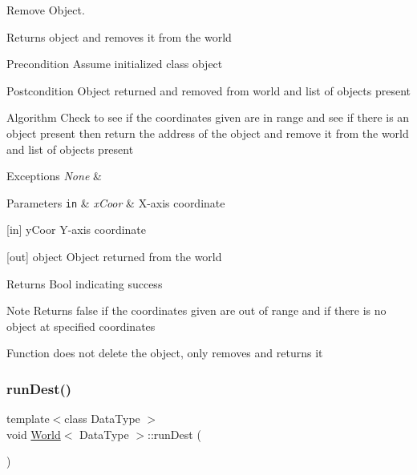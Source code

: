 Remove Object. 

Returns object and removes it from the world

\begin{DoxyPrecond}{Precondition}
Assume initialized class object
\end{DoxyPrecond}
\begin{DoxyPostcond}{Postcondition}
Object returned and removed from world and list of objects present
\end{DoxyPostcond}
\begin{DoxyParagraph}{Algorithm}
Check to see if the coordinates given are in range and see if there is an object present then return the address of the object and remove it from the world and list of objects present
\end{DoxyParagraph}

\begin{DoxyExceptions}{Exceptions}
{\em None} & \\
\hline
\end{DoxyExceptions}

\begin{DoxyParams}[1]{Parameters}
\mbox{\tt in}  & {\em x\+Coor} & X-\/axis coordinate\\
\hline
\end{DoxyParams}
\mbox{[}in\mbox{]} y\+Coor Y-\/axis coordinate

\mbox{[}out\mbox{]} object Object returned from the world

\begin{DoxyReturn}{Returns}
Bool indicating success
\end{DoxyReturn}
\begin{DoxyNote}{Note}
Returns false if the coordinates given are out of range and if there is no object at specified coordinates

Function does not delete the object, only removes and returns it 
\end{DoxyNote}
\hypertarget{class_world_abbf172fde89a6fdaef53c318d79f8837}{}\label{class_world_abbf172fde89a6fdaef53c318d79f8837} 
\subsubsection{\texorpdfstring{run\+Dest()}{runDest()}}
{\footnotesize\ttfamily template$<$class Data\+Type $>$ \\
void \hyperlink{class_world}{World}$<$ Data\+Type $>$\+::run\+Dest (\begin{DoxyParamCaption}{ }\end{DoxyParamCaption})\hspace{0.3cm}{\ttfamily [private]}}




